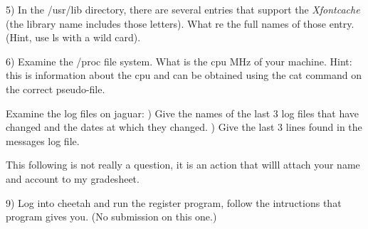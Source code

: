 5) In the {\ltt{}/usr/lib} directory, there are several entries that support
the {\it Xfontcache} (the library name includes those letters). What re the
full names of those entry.
(Hint, use ls with a wild card).

6) Examine the {\ltt{}/proc} file system.
What is the cpu MHz of your machine.
Hint: this is information about the cpu and can be obtained using the
cat command on the correct pseudo-file.

Examine the log files on {\ltt{}jaguar}:
\hfill{}) Give the names of the last 3 log files that have changed and 
the dates at which they changed.
\hfill{}) Give the last 3 lines found in the {\ltt{}messages} log file.

This following is not really a question, it is an action that
willl attach your name and account to my gradesheet.

9) Log into {\ltt{}cheetah} and run the {\ltt{}register} program,
follow the intructions that program gives you.
(No submission on this one.)

\bye
